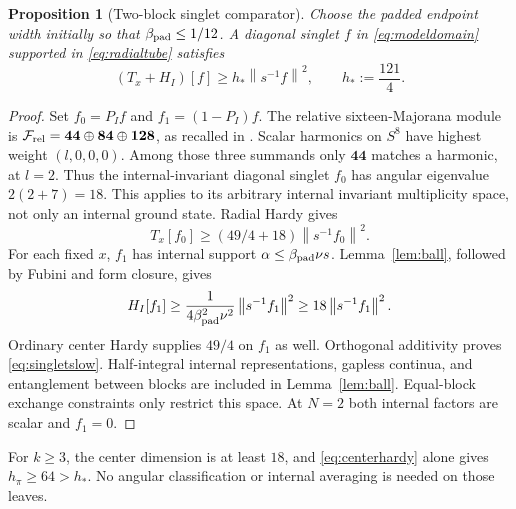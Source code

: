\documentclass[11pt,letterpaper]{article}
\newtheorem{proposition}[theorem]{Proposition}
\theoremstyle{definition}\newtheorem{hypothesis}[theorem]{Hypothesis}
\newcommand{\FF}{\mathcal F}
\newcommand{\norm}[1]{\left\lVert #1\right\rVert}
\numberwithin{equation}{section}
\begin{document}
\begin{proposition}[Two-block singlet comparator]\label{prop:singletslow}
Choose the padded endpoint width initially so that $\beta_{\rm pad}\le1/12$. A diagonal singlet $f$ in \eqref{eq:modeldomain} supported in \eqref{eq:radialtube} satisfies
\begin{equation}
 (T_x+H_I)[f]\ge h_*\norm{s^{-1}f}^2,
 \qquad h_*:=\frac{121}{4}.\label{eq:singletslow}
\end{equation}
\end{proposition}
\begin{proof}
Set $f_0=P_If$ and $f_1=(1-P_I)f$. The relative sixteen-Majorana module is
$\FF_{\rm rel}=\mathbf{44}\oplus\mathbf{84}\oplus\mathbf{128}$, as recalled in \cite[Section 2.4]{LY}. Scalar harmonics on $S^8$ have highest weight $(l,0,0,0)$. Among those three summands only $\mathbf{44}$ matches a harmonic, at $l=2$. Thus the internal-invariant diagonal singlet $f_0$ has angular eigenvalue $2(2+7)=18$. This applies to its arbitrary internal invariant multiplicity space, not only an internal ground state. Radial Hardy gives
\begin{equation}
 T_x[f_0]\ge(49/4+18)\norm{s^{-1}f_0}^2.\label{eq:angularzero}
\end{equation}
For each fixed $x$, $f_1$ has internal support $\alpha\le\beta_{\rm pad}\nu s$. Lemma~\ref{lem:ball}, followed by Fubini and form closure, gives
\begin{equation}
 H_I[f_1]\ge\frac1{4\beta_{\rm pad}^2\nu^2}\norm{s^{-1}f_1}^2
 \ge18\norm{s^{-1}f_1}^2.\label{eq:angularnonzero}
\end{equation}
Ordinary center Hardy supplies $49/4$ on $f_1$ as well. Orthogonal additivity proves \eqref{eq:singletslow}. Half-integral internal representations, gapless continua, and entanglement between blocks are included in Lemma~\ref{lem:ball}. Equal-block exchange constraints only restrict this space. At $N=2$ both internal factors are scalar and $f_1=0$.
\end{proof}
For $k\ge3$, the center dimension is at least $18$, and \eqref{eq:centerhardy} alone gives $h_\pi\ge64>h_*$. No angular classification or internal averaging is needed on those leaves.
\end{document}
